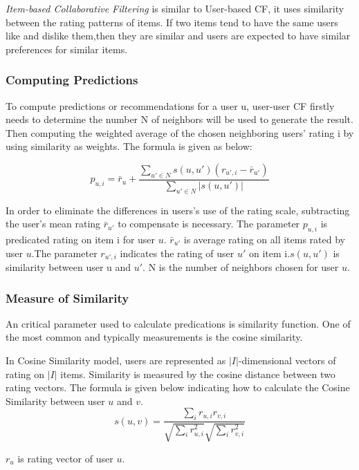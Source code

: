 \documentclass[conference]{IEEEtran}
\begin{document}
\textit{Item-based Collaborative Filtering} is similar to User-based CF, it uses similarity between the rating patterns of items. If two items tend to have the same users like and dislike them,then they are similar and users are expected to have similar preferences for similar items.
\subsubsection{Computing Predictions}
To compute predictions or recommendations for a user u, user-user CF firstly needs to determine the number N of neighbors will be used to generate the result. Then computing the weighted average of the chosen neighboring users' rating i by using similarity as weights. The formula is given as below:

\begin{equation}
p_{u,i} ={\bar r_{u}}  + \frac
{\sum\nolimits_{u' \in N} s(u,u')(r_{u',i} - {\bar r_{u'}})} 
{\sum\nolimits_{u' \in N} |s(u,u')|}
\end{equation}

In order to eliminate the differences in users's use of the rating scale, subtracting the user's mean rating ${\bar r_{u'}}$ to compensate is necessary.   The parameter $p_{u,i}$ is predicated rating on item i for user $u$.  ${\bar r_{u'}}$ is average rating on all items rated by user $u$.The parameter $r_{u',i}$ indicates the rating of user $u'$ on item i.$s(u,u')$ is similarity between user u and $u'$. N is the number of neighbors chosen for user $u$.  

\subsubsection{Measure of Similarity}
An critical parameter used to calculate predications is similarity function. One of the most common and typically measurements is the cosine similarity. 

In Cosine Similarity model, users are represented as $|\textit{I}|$-dimensional vectors of rating on $|\textit{I}|$ items. Similarity is measured by the cosine distance between two rating vectors. The formula is given below indicating how to calculate the Cosine Similarity between user $u$ and $v$. 
\begin{equation}
s(u,v) = \frac{\sum\nolimits_{i} r_{u,i}r_{v,i}}{\sqrt{\sum\nolimits_{i} {r^{2}_{u,i}}} \sqrt{\sum\nolimits_{i} {r^{2}_{v,i}}}} 
\end{equation}

$r_u$ is rating vector of user $u$.
\end{document}
